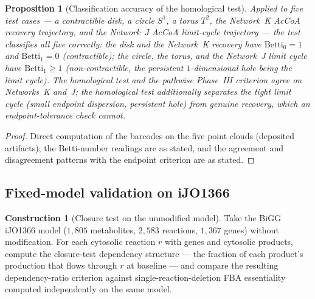 \documentclass[11pt,a4paper]{article}
\theoremstyle{plain}
\newtheorem{proposition}[theorem]{Proposition}
\theoremstyle{definition}
\newtheorem{construction}[theorem]{Construction}
\theoremstyle{remark}
\begin{document}
\begin{proposition}[Classification accuracy of the homological test]
\label{prop:persistent-homology-verdict}
Applied to five test cases --- a contractible disk, a circle
$S^{1}$, a torus $T^{2}$, the Network~K AcCoA recovery
trajectory, and the Network~J AcCoA limit-cycle trajectory --- the
test classifies all five correctly: the disk and the Network~K
recovery have $\mathrm{Betti}_0=1$ and $\mathrm{Betti}_1=0$
(contractible); the circle, the torus, and the Network~J limit
cycle have $\mathrm{Betti}_1\geq1$ (non-contractible, the
persistent $1$-dimensional hole being the limit cycle). The
homological test and the pathwise Phase~III criterion agree on
Networks~K and~J; the homological test additionally separates the
tight limit cycle (small endpoint dispersion, persistent hole)
from genuine recovery, which an endpoint-tolerance check cannot.
\end{proposition}

\begin{proof}
Direct computation of the barcodes on the five point clouds
(deposited artifacts); the Betti-number readings are as stated,
and the agreement and disagreement patterns with the endpoint
criterion are as stated.
\end{proof}

\subsection{Fixed-model validation on iJO1366}
\label{sec:network-essentiality}

\begin{construction}[Closure test on the unmodified model]
\label{con:iJO1366-external-essentiality}
Take the BiGG iJO1366 model ($1{,}805$ metabolites, $2{,}583$
reactions, $1{,}367$ genes) without modification. For each
cytosolic reaction $r$ with genes and cytosolic products, compute
the closure-test dependency structure --- the fraction of each
product's production that flows through $r$ at baseline --- and
compare the resulting dependency-ratio criterion against
single-reaction-deletion FBA essentiality computed independently
on the same model.
\end{construction}
\end{document}
